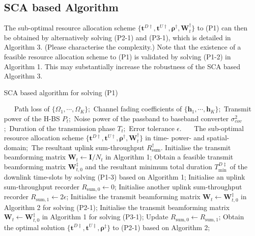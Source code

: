 \documentclass[12pt,draftcls,onecolumn,journal]{IEEEtran}
\begin{document}
\subsection{SCA based Algorithm}

The sub-optimal resource allocation scheme $\{\mathbf{t}^{D\dagger}, \mathbf{t}^{U\dagger}, \boldsymbol{\rho}^{\dagger}, \mathbf{W}_t^{\dagger}\}$ to (P1) can then be obtained by alternatively solving (P2-1) and (P3-1), which is detailed in Algorithm 3. {\color{red} (Please characterise the complexity.)}  Note that the existence of a feasible resource allocation scheme to (P1) is validated by solving (P1-2) in Algorithm 1. This may substantially increase the robustness of the SCA based Algorithm 3.

\begin{algorithm}[!t]
	\caption{SCA based algorithm for solving (P1)}
	\footnotesize
	\begin{algorithmic}[1]
		\REQUIRE ~~\
		Path loss of $\{\Omega_1,\cdots,\Omega_K\}$;\
		Channel fading coefficients of $\{\mathbf{h}_1,\cdots,\mathbf{h}_K\}$;\
		Transmit power of the H-BS $P_{t}$;\
		Noise power of the passband to baseband converter $\sigma^2_{cov}$;\
		Duration of the transmission phase $T_t$;\
		Error tolerance $\epsilon$.
		\ENSURE ~~\
		The sub-optimal resource allocation scheme $\{\mathbf{t}^{D\dagger}, \mathbf{t}^{U\dagger}, \boldsymbol{\rho}^{\dagger}, \mathbf{W}_t^{\dagger}\}$ in time- power- and spatial-domain;\
		The resultant uplink sum-throughput $R_{\text{sum}}^{\dagger}$.
		\STATE Initialise the transmit beamforming matrix $\mathbf{W}_t\leftarrow \mathbf{I} / N_t$ in Algorithm 1;
		\STATE Obtain a feasible transmit beamforming matrix $\mathbf{W}_{t,0}^{\ddagger}$ and the resultant minimum total duration $T_{\min}^{D\ddagger}$ of the downlink time-slots by solving (P1-3) based on Algorithm 1;
		\IF{$T_{\min}^{D\ddagger} < T_t$}
			\STATE Initialise an uplink sum-throughput recorder $R_{\text{sum},0}\leftarrow 0$;
			\STATE Initialise another uplink sum-throughput recorder $R_{\text{sum},1}\leftarrow 2\epsilon$;
			\STATE Initialise the transmit beamforming matrix $\mathbf{W}_t\leftarrow \mathbf{W}_{t,0}^{\ddagger}$ in Algorithm 2 for solving (P2-1);
			\STATE Initialise the transmit beamforming matrix $\mathbf{W}_t\leftarrow \mathbf{W}_{t,0}^{\ddagger}$ in Algorithm 1 for solving (P3-1);
				\STATE Update $R_{\text{sum},0}\leftarrow R_{\text{sum},1}$;
				\STATE Obtain the optimal solution $\{\mathbf{t}^{D\ddagger}, \mathbf{t}^{U\ddagger}, \boldsymbol{\rho}^{\ddagger}\}$ to (P2-1) based on Algorithm 2;

\end{algorithmic}
\end{algorithm}
\end{document}
